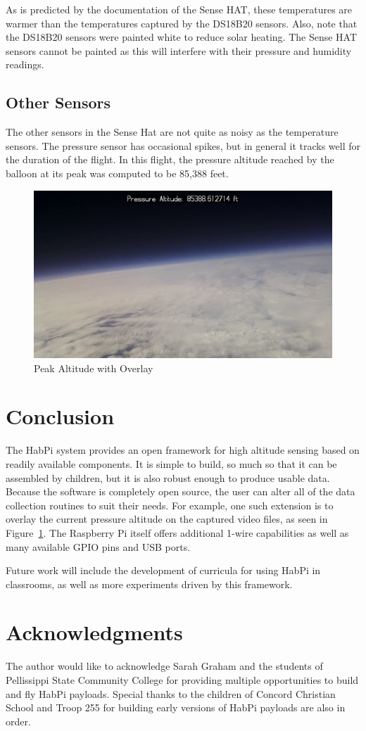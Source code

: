 \documentclass[journal]{new-aiaa}
\begin{document}
As is predicted by the documentation of the Sense HAT, these
temperatures are warmer than the temperatures captured by the DS18B20
sensors.  Also, note that the DS18B20 sensors were painted white to
reduce solar heating.  The Sense HAT sensors cannot be painted as this
will interfere with their pressure and humidity readings.

\subsection{Other Sensors}
The other sensors in the Sense Hat are not quite as noisy as the
temperature sensors.  The pressure sensor has occasional spikes, but
in general it tracks well for the duration of the flight.  In this
flight, the pressure altitude reached by the balloon at its peak was
computed to be 85,388 feet.  

\begin{figure}
    \centering
    \includegraphics[width=0.65\linewidth]{images/peak-altitude}
    \caption{Peak Altitude with Overlay}
    \label{fig:peak}
\end{figure}

\section{Conclusion}
The HabPi system provides an open framework for high altitude sensing
based on readily available components.  It is simple to build, so much
so that it can be assembled by children, but it is also robust enough
to produce usable data.  Because the software is completely open
source, the user can alter all of the data collection routines to
suit their needs.  For example, one such extension is to overlay the
current pressure altitude on the captured video files, as seen in
Figure~\ref{fig:peak}.  The Raspberry Pi itself offers additional
1-wire capabilities as well as many available GPIO pins and USB ports.  

Future work will include the development of curricula for using HabPi
in classrooms, as well as more experiments driven by this framework.

\section{Acknowledgments}
The author would like to acknowledge Sarah Graham and the students of
Pellissippi State Community College for providing multiple
opportunities to build and fly HabPi payloads.  Special thanks to the
children of Concord Christian School and Troop 255 for building early
versions of HabPi payloads are also in order.


\end{document}

